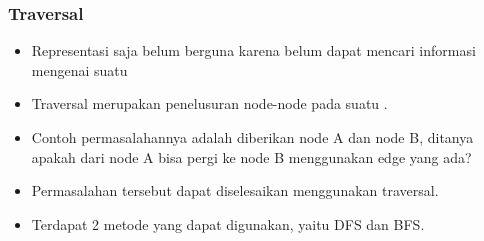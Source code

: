 \begin{frame}
\frametitle{\fGraph Traversal}

\begin{itemize}
  \item Representasi \fGraph saja belum berguna karena belum dapat mencari informasi mengenai suatu \fgraph
  \item \alert{\fGraph Traversal} merupakan penelusuran node-node pada suatu \fgraph.
  \item Contoh permasalahannya adalah diberikan node A dan node B, ditanya apakah dari node A bisa pergi ke node B menggunakan edge yang ada?
  \item Permasalahan tersebut dapat diselesaikan menggunakan \fgraph traversal.
  \item Terdapat 2 metode yang dapat digunakan, yaitu DFS dan BFS.
\end{itemize}
\end{frame}

